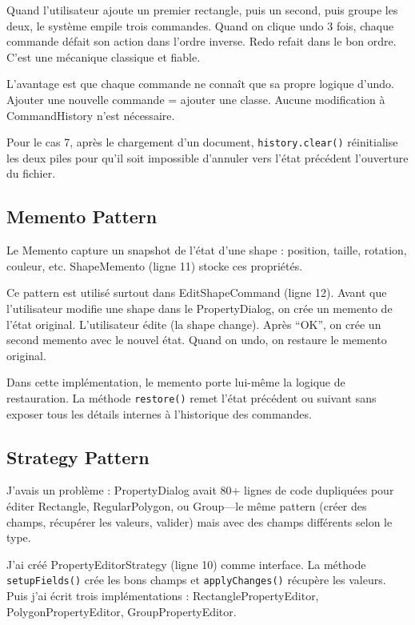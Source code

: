 \documentclass[11pt,a4paper,french]{article}
\begin{document}
Quand l'utilisateur ajoute un premier rectangle, puis un second, puis groupe les deux, le système empile trois commandes. Quand on clique undo 3 fois, chaque commande défait son action dans l'ordre inverse. Redo refait dans le bon ordre. C'est une mécanique classique et fiable.

L'avantage est que chaque commande ne connaît que sa propre logique d'undo. Ajouter une nouvelle commande = ajouter une classe. Aucune modification à CommandHistory n'est nécessaire.

Pour le cas 7, après le chargement d'un document, \texttt{history.clear()} réinitialise les deux piles pour qu'il soit impossible d'annuler vers l'état précédent l'ouverture du fichier.

\subsection{Memento Pattern}

Le Memento capture un snapshot de l'état d'une shape : position, taille, rotation, couleur, etc. ShapeMemento (ligne 11) stocke ces propriétés.

Ce pattern est utilisé surtout dans EditShapeCommand (ligne 12). Avant que l'utilisateur modifie une shape dans le PropertyDialog, on crée un memento de l'état original. L'utilisateur édite (la shape change). Après ``OK'', on crée un second memento avec le nouvel état. Quand on undo, on restaure le memento original.

Dans cette implémentation, le memento porte lui-même la logique de restauration. La méthode \texttt{restore()} remet l'état précédent ou suivant sans exposer tous les détails internes à l'historique des commandes.

\subsection{Strategy Pattern}

J'avais un problème : PropertyDialog avait 80+ lignes de code dupliquées pour éditer Rectangle, RegularPolygon, ou Group—le même pattern (créer des champs, récupérer les valeurs, valider) mais avec des champs différents selon le type.

J'ai créé PropertyEditorStrategy (ligne 10) comme interface. La méthode \texttt{setupFields()} crée les bons champs et \texttt{applyChanges()} récupère les valeurs. Puis j'ai écrit trois implémentations : RectanglePropertyEditor, PolygonPropertyEditor, GroupPropertyEditor.
\end{document}
